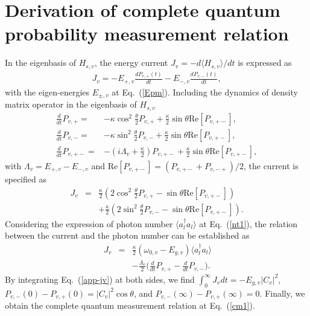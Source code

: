 \documentclass[twocolumn,showpacs,preprintnumbers,amsmath,amssymb]{revtex4}
\begin{document}
\section{Derivation of complete quantum probability measurement relation}
In the eigenbasis of $H_{s,v}$, the energy current $J_v=-d{\langle}H_{s,v}{\rangle}/dt$ is expressed as
\begin{eqnarray}
J_v=-E_{+,v}\frac{dP_{v,+}(t)}{dt}-E_{-,v}\frac{dP_{v,-}(t)}{dt},
\end{eqnarray}
with the eigen-energies $E_{\pm,v}$ at Eq.~(\ref{Epm}).
Including the dynamics of density matrix operator in the eigenbasis of $H_{s,v}$
\begin{subequations}
\begin{align}
 \frac{d}{dt}P_{v,+}=&-\kappa\cos^2\frac{\theta}{2}P_{v,+}
 +\frac{\kappa}{2}\sin{{\theta}}\textrm{Re}[P_{v,+-}],\\
 \frac{d}{dt}P_{v,-}=&-\kappa\sin^2 \frac{\theta}{2}P_{v,-}+\frac{\kappa}{2}\sin{{\theta}}\textrm{Re}[P_{v,+-}],\\
\frac{d}{dt}P_{v,+-}=&-(i\Lambda_v+\frac{\kappa}{2})P_{v,+-}
+\frac{\kappa}{2}{\sin{\theta}}\textrm{Re}[P_{v,+-}],
\end{align}
\end{subequations}
with $\Lambda_v=E_{+,v}-E_{-,v}$ and $\textrm{Re}[P_{v,+-}]=(P_{v,+-}+P_{v,-+})/2$,
the current is specified as
\begin{eqnarray}
J_v&=&\frac{\kappa}{2}(2\cos^2\frac{\theta}{2}P_{v,+}
 -\sin{{\theta}}\textrm{Re}[P_{v,+-}])\nonumber\\
 &&+\frac{\kappa}{2}(2\sin^2\frac{\theta}{2}P_{v,-}
 -\sin{{\theta}}\textrm{Re}[P_{v,+-}]).
\end{eqnarray}
Considering the expression of photon number ${\langle}a^\dag_la_l{\rangle}$ at Eq.~(\ref{nt1}), the relation between the current and the photon number can be established as
\begin{eqnarray}~\label{app-jv}
J_v&=&\frac{\kappa}{2}(\omega_{0,v}-E_{g,v}){\langle}a^\dag_la_l{\rangle}\\
&&-\frac{\Lambda_v}{2}
\Big(\frac{d}{dt}P_{v,+}-\frac{d}{dt}P_{v,-}\Big).\nonumber
\end{eqnarray}
By integrating Eq.~(\ref{app-jv}) at both sides, we find
$\int^\infty_0J_vdt=-E_{g,v}|C_v|^2$, $P_{v,-}(0)-P_{v,+}(0)=|C_v|^2\cos\theta$,
	and $P_{v,-}(\infty)-P_{v,+}(\infty)=0$.
Finally, we obtain the complete quantum measurement relation at Eq.~(\ref{cm1}).
\end{document}
